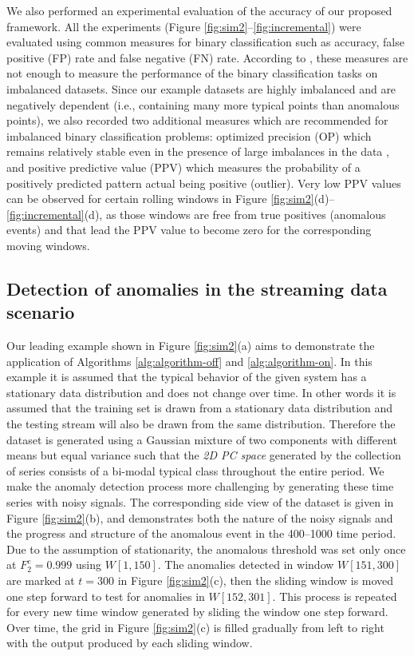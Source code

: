 \documentclass[12pt]{article}
\begin{document}
We also performed an experimental evaluation of the accuracy of our
proposed framework. All the experiments (Figure
\ref{fig:sim2}--\ref{fig:incremental}) were evaluated using common
measures for binary classification such as accuracy, false positive (FP)
rate and false negative (FN) rate. According to
\citet{hossin2015review}, these measures are not enough to measure the
performance of the binary classification tasks on imbalanced datasets.
Since our example datasets are highly imbalanced and are negatively
dependent (i.e., containing many more typical points than anomalous
points), we also recorded two additional measures which are recommended
for imbalanced binary classification problems: optimized precision (OP)
which remains relatively stable even in the presence of large imbalances
in the data \citep{ranawana2006optimized}, and positive predictive value
(PPV) which measures the probability of a positively predicted pattern
actual being positive (outlier). Very low PPV values can be observed for
certain rolling windows in Figure
\ref{fig:sim2}(d)--\ref{fig:incremental}(d), as those windows are free
from true positives (anomalous events) and that lead the PPV value to
become zero for the corresponding moving windows.

\hypertarget{detection-of-anomalies-in-the-streaming-data-scenario}{%
\subsection{Detection of anomalies in the streaming data
scenario}\label{detection-of-anomalies-in-the-streaming-data-scenario}}

\label{sec:stationary_case}

Our leading example shown in Figure \ref{fig:sim2}(a) aims to
demonstrate the application of Algorithms \ref{alg:algorithm-off} and
\ref{alg:algorithm-on}. In this example it is assumed that the typical
behavior of the given system has a stationary data distribution and does
not change over time. In other words it is assumed that the training set
is drawn from a stationary data distribution and the testing stream will
also be drawn from the same distribution. Therefore the dataset is
generated using a Gaussian mixture of two components with different
means but equal variance such that the \emph{2D PC space} generated by
the collection of series consists of a bi-modal typical class throughout
the entire period. We make the anomaly detection process more
challenging by generating these time series with noisy signals. The
corresponding side view of the dataset is given in Figure
\ref{fig:sim2}(b), and demonstrates both the nature of the noisy signals
and the progress and structure of the anomalous event in the 400--1000
time period. Due to the assumption of stationarity, the anomalous
threshold was set only once at \(F_{2}^{e} = 0.999\) using
\(W[1, 150]\). The anomalies detected in window \(W[151, 300]\) are
marked at \(t=300\) in Figure \ref{fig:sim2}(c), then the sliding window
is moved one step forward to test for anomalies in \(W[152, 301]\). This
process is repeated for every new time window generated by sliding the
window one step forward. Over time, the grid in Figure \ref{fig:sim2}(c)
is filled gradually from left to right with the output produced by each
sliding window.
\end{document}
